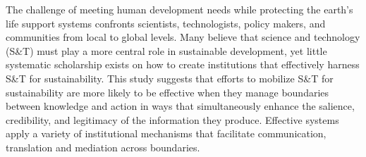 The challenge of meeting human development needs while protecting the earth's life support systems confronts scientists, technologists, policy makers, and communities from local to global levels. Many believe that science and technology (S\&T) must play a more central role in sustainable development, yet little systematic scholarship exists on how to create institutions that effectively harness S\&T for sustainability. This study suggests that efforts to mobilize S\&T for sustainability are more likely to be effective when they manage boundaries between knowledge and action in ways that simultaneously enhance the salience, credibility, and legitimacy of the information they produce. Effective systems apply a variety of institutional mechanisms that facilitate communication, translation and mediation across boundaries.
